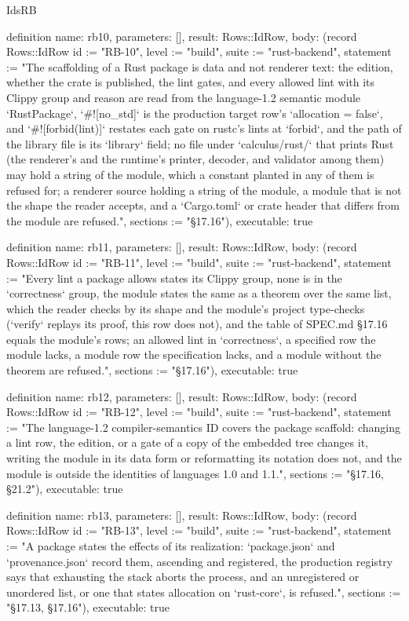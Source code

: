 \begin{lexlean}{IdsRB}
\begin{semanticmodule}
definition{
  name: rb10,
  parameters: [],
  result: Rows::IdRow,
  body: (record Rows::IdRow {id := "RB-10", level := "build", suite := "rust-backend", statement := "The scaffolding of a Rust package is data and not renderer text: the edition, whether the crate is published, the lint gates, and every allowed lint with its Clippy group and reason are read from the language-1.2 semantic module `RustPackage`, `#![no_std]` is the production target row's `allocation = false`, and `#![forbid(lint)]` restates each gate on rustc's lints at `forbid`, and the path of the library file is its `library` field; no file under `calculus/rust/` that prints Rust (the renderer's and the runtime's printer, decoder, and validator among them) may hold a string of the module, which a constant planted in any of them is refused for; a renderer source holding a string of the module, a module that is not the shape the reader accepts, and a `Cargo.toml` or crate header that differs from the module are refused.", sections := "§17.16"}),
  executable: true
}

definition{
  name: rb11,
  parameters: [],
  result: Rows::IdRow,
  body: (record Rows::IdRow {id := "RB-11", level := "build", suite := "rust-backend", statement := "Every lint a package allows states its Clippy group, none is in the `correctness` group, the module states the same as a theorem over the same list, which the reader checks by its shape and the module's project type-checks (`verify` replays its proof, this row does not), and the table of SPEC.md §17.16 equals the module's rows; an allowed lint in `correctness`, a specified row the module lacks, a module row the specification lacks, and a module without the theorem are refused.", sections := "§17.16"}),
  executable: true
}

definition{
  name: rb12,
  parameters: [],
  result: Rows::IdRow,
  body: (record Rows::IdRow {id := "RB-12", level := "build", suite := "rust-backend", statement := "The language-1.2 compiler-semantics ID covers the package scaffold: changing a lint row, the edition, or a gate of a copy of the embedded tree changes it, writing the module in its data form or reformatting its notation does not, and the module is outside the identities of languages 1.0 and 1.1.", sections := "§17.16, §21.2"}),
  executable: true
}

definition{
  name: rb13,
  parameters: [],
  result: Rows::IdRow,
  body: (record Rows::IdRow {id := "RB-13", level := "build", suite := "rust-backend", statement := "A package states the effects of its realization: `package.json` and `provenance.json` record them, ascending and registered, the production registry says that exhausting the stack aborts the process, and an unregistered or unordered list, or one that states allocation on `rust-core`, is refused.", sections := "§17.13, §17.16"}),
  executable: true
}


\end{semanticmodule}
\end{lexlean}
